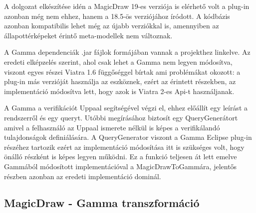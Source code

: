 A dolgozat elkészítése idén a MagicDraw 19-es verziója is elérhető volt a plug-in azonban még nem ehhez, hanem a 18.5-ös verziójához íródott. A kódbázis azonban kompatibilis lehet még az újabb verziókkal is, amennyiben az állapottérképeket érintő meta-modellek nem változnak.

A Gamma dependenciák .jar fájlok formájában vannak a projekthez linkelve. Az eredeti elképzelés szerint, ahol csak lehet a Gamma nem legyen módosítva, viszont egyes részei Viatra 1.6 függőséggel bírtak ami problémákat okozott: a plug-in más verzióját használja az eszköznek, ezért az érintett részekben, az implementáció módosítva lett, hogy azok is Viatra 2-es Api-t használjanak.

A Gamma a verifikációt Uppaal segítségével végzi el, ehhez előállít egy leírást a rendszerről és egy queryt. Utóbbi megírásához biztosít egy QueryGenerátort amivel a felhasználó az Uppaal ismerete nélkül is képes a verifikálandó tulajdonságok definiálására. A QueryGenerator viszont a Gamma Eclipse plug-in részéhez tartozik ezért az implementáció módosítása itt is szükséges volt, hogy önálló részként is képes legyen működni. Ez a funkció teljesen át lett emelve Gammából módosított implementációval a MagicDrawToGammára, jelentős részben azonban az eredeti implementáció dominál.

\subsection{MagicDraw - Gamma transzformáció}
